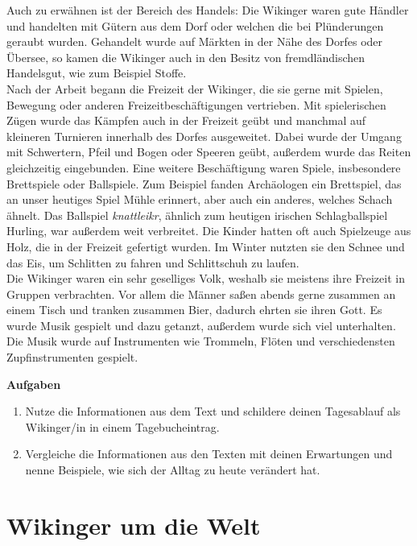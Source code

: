 \documentclass[12pt,a4paper,ngerman,openany]{book}
\newcommand{\aufgaben}[1]{
  \begin{tcolorbox}
    \textbf{Aufgaben}
    \begin{enumerate}
      #1
    \end{enumerate}
  \end{tcolorbox}
} %
\newcommand{\fchapter}[1]{\chapter{#1}\thispagestyle{chapterstyle}}
\begin{document}
Auch zu erwähnen ist der Bereich des Handels: Die Wikinger waren gute Händler und handelten mit Gütern aus dem Dorf oder welchen die bei Plünderungen geraubt wurden. Gehandelt wurde auf Märkten in der Nähe des Dorfes oder Übersee, so kamen die Wikinger auch in den Besitz von fremdländischen Handelsgut, wie zum Beispiel Stoffe.\\
Nach der Arbeit begann die Freizeit der Wikinger, die sie gerne mit Spielen, Bewegung oder anderen Freizeitbeschäftigungen vertrieben.
Mit spielerischen Zügen wurde das Kämpfen auch in der Freizeit geübt und manchmal auf kleineren Turnieren innerhalb des Dorfes ausgeweitet. Dabei wurde der Umgang mit Schwertern, Pfeil und Bogen oder Speeren geübt, außerdem wurde das Reiten gleichzeitig eingebunden. Eine weitere Beschäftigung waren Spiele, insbesondere Brettspiele oder Ballspiele. Zum Beispiel fanden Archäologen ein Brettspiel, das an unser heutiges Spiel \glqq Mühle\grqq{} erinnert, aber auch ein anderes, welches Schach ähnelt. Das Ballspiel \textit{knattleikr}, ähnlich zum heutigen irischen Schlagballspiel \glqq Hurling\grqq{}, war außerdem weit verbreitet. Die Kinder hatten oft auch Spielzeuge aus Holz, die in der Freizeit gefertigt wurden. Im Winter nutzten sie den Schnee und das Eis, um Schlitten zu fahren und Schlittschuh zu laufen.\\
Die Wikinger waren ein sehr geselliges Volk, weshalb sie meistens ihre Freizeit in Gruppen verbrachten.
Vor allem die Männer saßen abends gerne zusammen an einem Tisch und tranken zusammen Bier, dadurch ehrten sie ihren Gott. Es wurde Musik gespielt und dazu getanzt, außerdem wurde sich viel unterhalten. Die Musik wurde auf Instrumenten wie Trommeln, Flöten und verschiedensten Zupfinstrumenten gespielt.

\vspace{0.66cm}

\aufgaben{
  \item Nutze die Informationen aus dem Text und schildere deinen Tagesablauf als Wikinger/in in einem Tagebucheintrag.
  \item Vergleiche die Informationen aus den Texten mit deinen Erwartungen und nenne Beispiele, wie sich der Alltag zu heute verändert hat.
}

\fchapter{Wikinger um die Welt}
\end{document}
